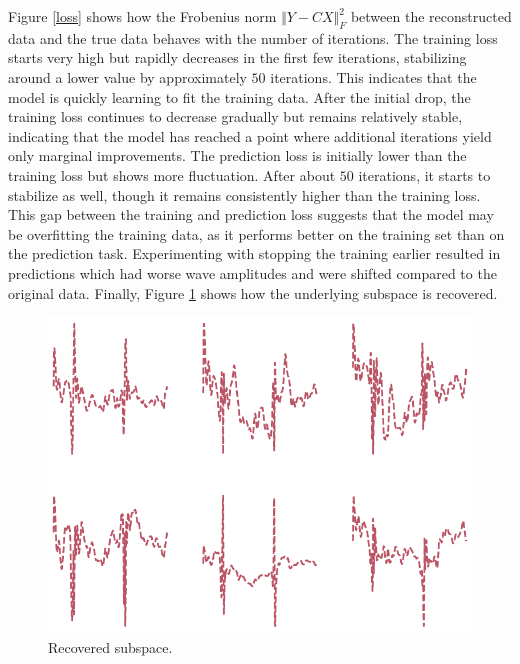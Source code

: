 \documentclass{mldsmsc}
\begin{document}
\noindent Figure \ref{loss} shows how the Frobenius norm $\Vert Y - CX \Vert^2_F$ between the reconstructed data and the true data behaves with the number of iterations. The training loss starts very high but rapidly decreases in the first few iterations, stabilizing around a lower value by approximately $50$ iterations. This indicates that the model is quickly learning to fit the training data. After the initial drop, the training loss continues to decrease gradually but remains relatively stable, indicating that the model has reached a point where additional iterations yield only marginal improvements. The prediction loss is initially lower than the training loss but shows more fluctuation. After about $50$ iterations, it starts to stabilize as well, though it remains consistently higher than the training loss. This gap between the training and prediction loss suggests that the model may be overfitting the training data, as it performs better on the training set than on the prediction task. Experimenting with stopping the training earlier resulted in predictions which had worse wave amplitudes and were shifted compared to the original data. Finally, Figure \ref{bases} shows how the underlying subspace is recovered. \newline

\begin{figure}[h]
\begin{center}
\includegraphics[scale=0.6]{images/forecast/periodic_bases.pdf}
\caption{Recovered subspace.}
\label{bases}
\end{center}
\end{figure}
\end{document}
